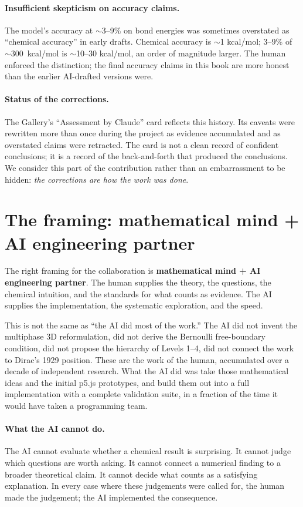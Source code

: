 \paragraph{Insufficient skepticism on accuracy claims.}
The model's accuracy at $\sim$3--9\% on bond energies was sometimes overstated as ``chemical accuracy'' in early drafts. Chemical accuracy is $\sim$1 kcal/mol; 3--9\% of $\sim$300~kcal/mol is $\sim$10--30 kcal/mol, an order of magnitude larger. The human enforced the distinction; the final accuracy claims in this book are more honest than the earlier AI-drafted versions were.

\paragraph{Status of the corrections.}
The Gallery's ``Assessment by Claude'' card reflects this history. Its caveats were rewritten more than once during the project as evidence accumulated and as overstated claims were retracted. The card is not a clean record of confident conclusions; it is a record of the back-and-forth that produced the conclusions. We consider this part of the contribution rather than an embarrassment to be hidden: \emph{the corrections are how the work was done}.

\section{The framing: mathematical mind + AI engineering partner}\label{sec:framing}

The right framing for the collaboration is \textbf{mathematical mind + AI engineering partner}. The human supplies the theory, the questions, the chemical intuition, and the standards for what counts as evidence. The AI supplies the implementation, the systematic exploration, and the speed.

This is not the same as ``the AI did most of the work.'' The AI did not invent the multiphase 3D reformulation, did not derive the Bernoulli free-boundary condition, did not propose the hierarchy of Levels 1--4, did not connect the work to Dirac's 1929 position. These are the work of the human, accumulated over a decade of independent research. What the AI did was take those mathematical ideas and the initial p5.js prototypes, and build them out into a full implementation with a complete validation suite, in a fraction of the time it would have taken a programming team.

\paragraph{What the AI cannot do.}
The AI cannot evaluate whether a chemical result is surprising. It cannot judge which questions are worth asking. It cannot connect a numerical finding to a broader theoretical claim. It cannot decide what counts as a satisfying explanation. In every case where these judgements were called for, the human made the judgement; the AI implemented the consequence.

